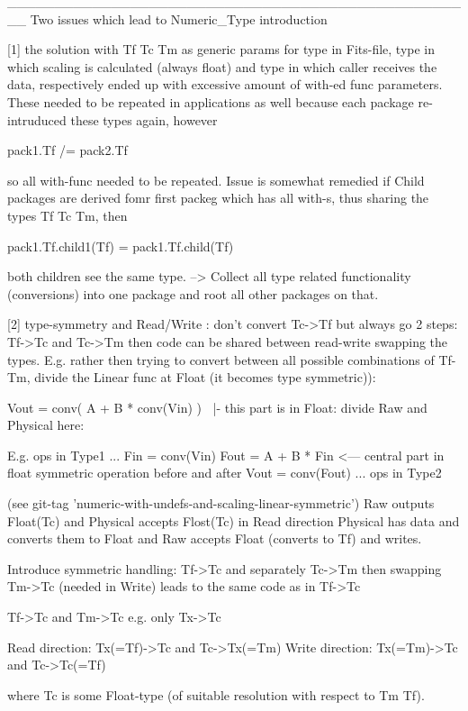 __________________________________________________
Two issues which lead to Numeric_Type introduction

[1] 
the solution with Tf Tc Tm as generic params for type in Fits-file, type in which scaling is calculated (always float) and type in which caller receives the data, respectively ended up
with excessive amount of with-ed func parameters. These needed to be repeated in applications
as well because each package re-intruduced these types again, however

pack1.Tf /= pack2.Tf

so all with-func needed to be repeated. Issue is somewhat remedied if Child packages are derived
fomr first packeg which has all with-s, thus sharing the types Tf Tc Tm, then

pack1.Tf.child1(Tf) = pack1.Tf.child(Tf)

both children see the same type. --> Collect all type related functionality (conversions) into
one package and root all other packages on that.


[2]
type-symmetry and Read/Write : don't convert Tc->Tf but always go 2 steps: Tf->Tc and Tc->Tm
then code can be shared between read-write swapping the types.
E.g. rather then trying to convert between all possible combinations of Tf-Tm,
divide the Linear func at Float (it becomes type symmetric)):

Vout = conv( A + B * conv(Vin) )
            ^^^^^^^^<- this part is in Float: divide Raw and Physical here:

E.g.
ops in Type1 ...
Fin = conv(Vin)
Fout = A + B * Fin  <--- central part in float symmetric operation before and after
Vout = conv(Fout)
... ops in Type2

(see git-tag 'numeric-with-undefs-and-scaling-linear-symmetric')
Raw outputs Float(Tc) and Physical accepts Flost(Tc) in Read direction
Physical has data and converts them to Float and Raw accepts Float (converts to Tf) and writes.

Introduce symmetric handling: Tf->Tc and separately Tc->Tm
then swapping Tm->Tc (needed in Write) leads to the same code as in Tf->Tc

Tf->Tc and Tm->Tc e.g. only Tx->Tc 

Read  direction: Tx(=Tf)->Tc and Tc->Tx(=Tm)
Write direction: Tx(=Tm)->Tc and Tc->Tc(=Tf)

where Tc is some Float-type (of suitable resolution with respect to Tm Tf).







